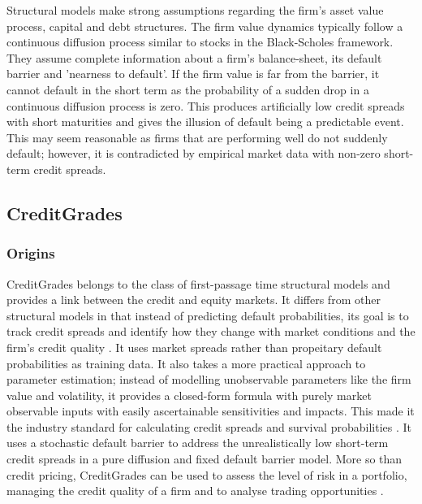 \documentclass[11t,a4paper]{article}
\begin{document}
 Structural models make strong assumptions regarding the firm's asset value process, capital and debt structures. The firm value dynamics typically follow a continuous diffusion process similar to stocks in the Black-Scholes framework. They assume complete information about a firm's balance-sheet, its default barrier and 'nearness to default'. If the firm value is far from the barrier, it cannot default in the short term as the probability of a sudden drop in a continuous diffusion process is zero. This produces artificially low credit spreads with short maturities and gives the illusion of default being a predictable event. This may seem reasonable as firms that are performing well do not suddenly default; however, it is contradicted by empirical market data with non-zero short-term credit spreads.\\
 
\subsection{CreditGrades}
\subsubsection{Origins}
CreditGrades belongs to the class of first-passage time structural models and provides a link between the credit and equity markets. It differs from other structural models in that instead of predicting default probabilities, its goal is to track credit spreads and identify how they change with market conditions and the firm's credit quality \cite{sfin}. It uses market spreads rather than propeitary default probabilities as training data. It also takes a more practical approach to parameter estimation; instead of modelling unobservable parameters like the firm value and volatility, it provides a closed-form formula with purely market observable inputs with easily ascertainable sensitivities and impacts. This made it the industry standard for calculating credit spreads and survival probabilities \cite{cgtechdoc}. It uses a stochastic default barrier to address the unrealistically low short-term credit spreads in a pure diffusion and fixed default barrier model. More so than credit pricing, CreditGrades can be used to assess the level of risk in a portfolio, managing the credit quality of a firm and to analyse trading opportunities \cite{cgtechdoc}. 
\end{document}
